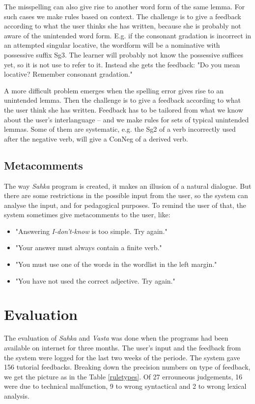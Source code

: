 \documentclass[11pt]{article}
\begin{document}
The misspelling can also give rise to another word form of the same lemma. For such cases we make rules based on context. The challenge is to give a feedback according to what the user thinks she has written, because she is probably not aware of the unintended word form. E.g. if the consonant gradation is incorrect in an attempted singular locative, the wordform will be a nominative with possessive suffix Sg3. The learner will probably not know the possessive suffices yet, so it is not use to refer to it. Instead she gets the feedback: "Do you mean locative? Remember consonant gradation." 

A more difficult problem emerges when the spelling error gives rise to an unintended lemma. Then the challenge is to give a feedback according to what the user think she has written. Feedback has to be tailored from what we know about the user’s interlanguage – and we make rules for sets of typical unintended lemmas. Some of them are systematic, e.g. the Sg2 of a verb incorrectly used after the negative verb, will give a ConNeg of a derived verb.  


\subsection{Metacomments}
The way \textit{Sahka} program is created, it makes an illusion of a natural dialogue. But there are some restrictions in the possible input from the user, so the system can analyse the input, and for pedagogical purposes. To remind the user of that, the system sometimes give metacomments to the user, like:
\begin{itemize}
\setlength{\itemsep}{-0.2cm}
\item "Answering \textit{I-don't-know} is too simple. Try again."
\item "Your answer must always contain a finite verb."
\item "You must use one of the words in the wordlist in the left margin."
\item "You have not used the correct adjective. Try again."
\end{itemize}



\section{Evaluation}
The evaluation of \textit{Sahka} and \textit{Vasta} was done when the programs had been available on internet for three months. The user's input and the feedback from the system were logged for the last two weeks of the periode. The system gave 156 tutorial feedbacks. Breaking down the precision numbers on type of feedback, we get the picture as in the Table \ref{ruletypes}. Of 27 errouneous judgements, 16 were due to technical malfunction, 9 to wrong syntactical and 2 to wrong lexical analysis. \\
\end{document}
